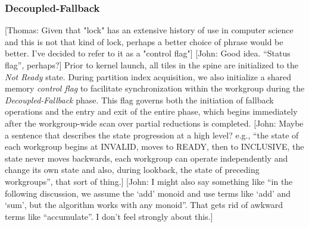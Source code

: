 \documentclass[sigconf]{acmart}
\newcommand{\thomas}[1]{{\footnotesize\color{orange}[Thomas: #1]}}
\newcommand{\john}[1]{{\footnotesize\color{cyan}[John: #1]}}
\begin{document}
\subsubsection{Decoupled-Fallback}
\thomas{Given that "lock" has an extensive history of use in computer science and this is not that kind of lock, perhaps a better choice of phrase would be better. I've decided to refer to it as a "control flag"} \john{Good idea. ``Status flag'', perhaps?}
Prior to kernel launch, all tiles in the spine are initialized to the \emph{Not Ready} state. During partition index acquisition, we also initialize a shared memory \emph{control flag} to facilitate synchronization within the workgroup during the \emph{Decoupled-Fallback} phase. This flag governs both the initiation of fallback operations and the entry and exit of the entire phase, which begins immediately after the workgroup-wide scan over partial reductions is completed.
\john{Maybe a sentence that describes the state progression at a high level? e.g., ``the state of each workgroup begins at INVALID, moves to READY, then to INCLUSIVE, the state never moves backwards, each workgroup can operate independently and change its own state and also, during lookback, the state of preceding workgroups'', that sort of thing.}
\john{I might also say something like ``in the following discussion, we assume the `add' monoid and use terms like `add' and `sum', but the algorithm works with any monoid''. That gets rid of awkward terms like ``accumulate''. I don't feel strongly about this.}
\end{document}
